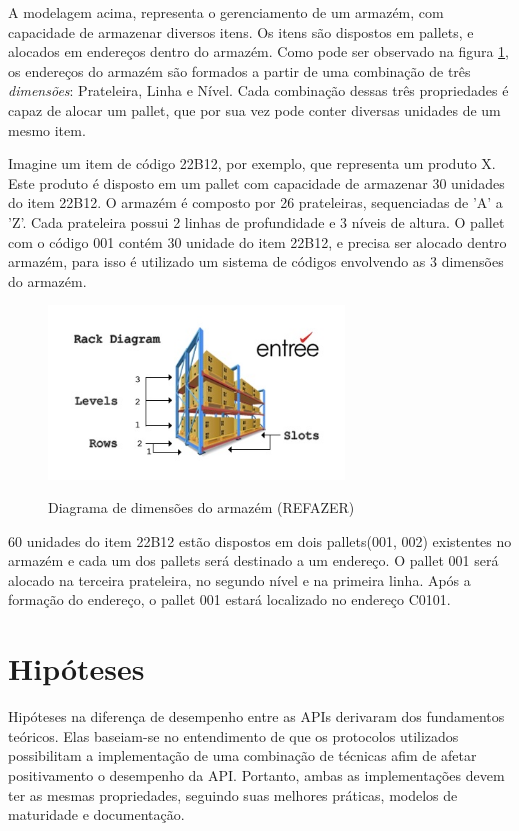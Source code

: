 A modelagem acima, representa o gerenciamento de um armazém, com capacidade de armazenar diversos itens. Os itens são dispostos em pallets, e alocados em endereços dentro do armazém. Como pode ser observado na figura \ref{fig:rack}, os endereços do armazém são formados a partir de uma combinação de três \textit{dimensões}: Prateleira, Linha e Nível. Cada combinação dessas três propriedades é capaz de alocar um pallet, que por sua vez pode conter diversas unidades de um mesmo item.

Imagine um item de código 22B12, por exemplo, que representa um produto X. Este produto é disposto em um pallet com capacidade de armazenar 30 unidades do item 22B12. O armazém é composto por 26 prateleiras, sequenciadas de 'A' a 'Z'. Cada prateleira possui 2 linhas de profundidade e  3 níveis de altura. O pallet com o código 001 contém 30 unidade do item 22B12, e precisa ser alocado dentro armazém, para isso é utilizado um sistema de códigos envolvendo as 3 dimensões do armazém.


\begin{figure}[htbp]
\centering
\includegraphics[width=0.7\textwidth]{figuras/rack.jpg}
\label{fig:rack}
\caption{Diagrama de dimensões do armazém (REFAZER)}
\author{fonte: Autor}
\end{figure}

60 unidades do item 22B12 estão dispostos em dois pallets(001, 002) existentes no armazém e cada um dos pallets será destinado a um endereço. O pallet 001 será alocado na terceira prateleira, no segundo nível e na primeira linha. Após a formação do endereço, o pallet 001 estará localizado no endereço C0101.  

\section{Hipóteses} \label{sechHipóteses}

Hipóteses na diferença de desempenho entre as APIs derivaram dos fundamentos teóricos. Elas baseiam-se no entendimento de que os protocolos utilizados possibilitam a implementação de uma combinação de técnicas afim de afetar positivamento o desempenho da API. Portanto, ambas as implementações devem ter as mesmas propriedades, seguindo suas melhores práticas, modelos de maturidade e documentação.

